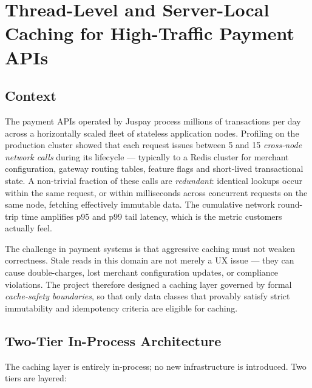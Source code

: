 \documentclass[12pt,a4paper,oneside]{report}
\begin{document}

\chapter[Distributed Caching for High-Traffic APIs]{Thread-Level and Server-Local Caching for High-Traffic Payment APIs}
\label{chap:caching}

\section{Context}

The payment APIs operated by Juspay process millions of transactions per day across a horizontally scaled fleet of stateless application nodes. Profiling on the production cluster showed that each request issues between 5 and 15 \emph{cross-node network calls} during its lifecycle --- typically to a Redis cluster for merchant configuration, gateway routing tables, feature flags and short-lived transactional state. A non-trivial fraction of these calls are \emph{redundant}: identical lookups occur within the same request, or within milliseconds across concurrent requests on the same node, fetching effectively immutable data. The cumulative network round-trip time amplifies p95 and p99 tail latency, which is the metric customers actually feel.

The challenge in payment systems is that aggressive caching must not weaken correctness. Stale reads in this domain are not merely a UX issue --- they can cause double-charges, lost merchant configuration updates, or compliance violations. The project therefore designed a caching layer governed by formal \emph{cache-safety boundaries}, so that only data classes that provably satisfy strict immutability and idempotency criteria are eligible for caching.

\section{Two-Tier In-Process Architecture}

The caching layer is entirely in-process; no new infrastructure is introduced. Two tiers are layered:
\end{document}
